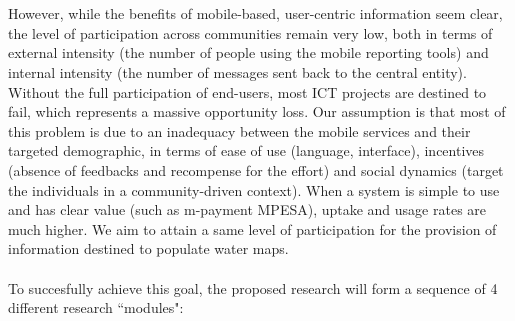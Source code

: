 \documentclass[11pt]{article}
\begin{document}
\\\\
However, while the benefits of mobile-based, user-centric information seem clear, the level of participation across communities remain very low, both in terms of external intensity (the number of people using the mobile reporting tools) and internal intensity (the number of messages sent back to the central entity). Without the full participation of end-users, most ICT projects are destined to fail, which represents a massive opportunity loss. Our assumption is that most of this problem is due to an  inadequacy between the mobile services and their targeted demographic, in terms of ease of use (language, interface), incentives (absence of feedbacks and recompense for the effort) and social dynamics (target the individuals in a community-driven context). When a system is simple to use and has clear value (such as m-payment MPESA), uptake and usage rates are much higher. We aim to attain a same level of participation for the provision of information destined to populate water maps.  
\\\\
To succesfully achieve this goal, the proposed research will form a sequence of 4 different research ``modules":
\end{document}
